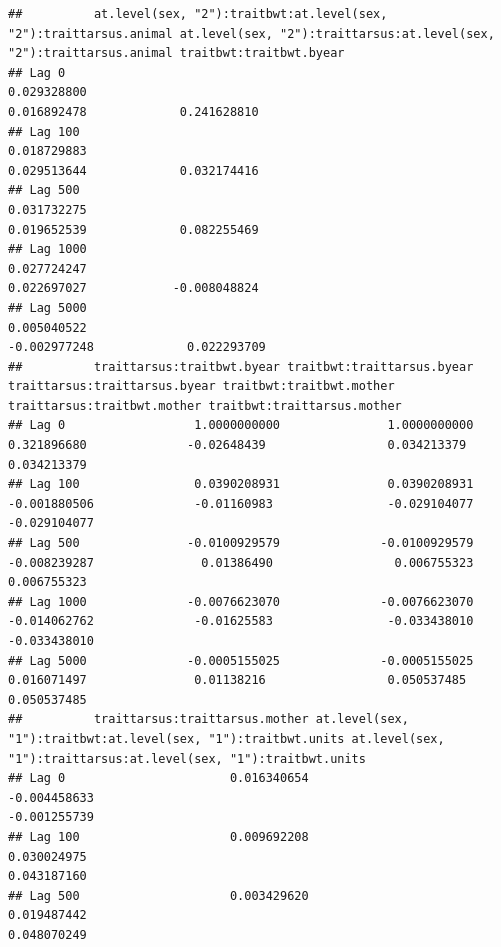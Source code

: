 \documentclass[
  12pt,
]{book}
\begin{document}
\begin{verbatim}
##          at.level(sex, "2"):traitbwt:at.level(sex, "2"):traittarsus.animal at.level(sex, "2"):traittarsus:at.level(sex, "2"):traittarsus.animal traitbwt:traitbwt.byear
## Lag 0                                                          0.029328800                                                          0.016892478             0.241628810
## Lag 100                                                        0.018729883                                                          0.029513644             0.032174416
## Lag 500                                                        0.031732275                                                          0.019652539             0.082255469
## Lag 1000                                                       0.027724247                                                          0.022697027            -0.008048824
## Lag 5000                                                       0.005040522                                                         -0.002977248             0.022293709
##          traittarsus:traitbwt.byear traitbwt:traittarsus.byear traittarsus:traittarsus.byear traitbwt:traitbwt.mother traittarsus:traitbwt.mother traitbwt:traittarsus.mother
## Lag 0                  1.0000000000               1.0000000000                   0.321896680              -0.02648439                 0.034213379                 0.034213379
## Lag 100                0.0390208931               0.0390208931                  -0.001880506              -0.01160983                -0.029104077                -0.029104077
## Lag 500               -0.0100929579              -0.0100929579                  -0.008239287               0.01386490                 0.006755323                 0.006755323
## Lag 1000              -0.0076623070              -0.0076623070                  -0.014062762              -0.01625583                -0.033438010                -0.033438010
## Lag 5000              -0.0005155025              -0.0005155025                   0.016071497               0.01138216                 0.050537485                 0.050537485
##          traittarsus:traittarsus.mother at.level(sex, "1"):traitbwt:at.level(sex, "1"):traitbwt.units at.level(sex, "1"):traittarsus:at.level(sex, "1"):traitbwt.units
## Lag 0                       0.016340654                                                  -0.004458633                                                     -0.001255739
## Lag 100                     0.009692208                                                   0.030024975                                                      0.043187160
## Lag 500                     0.003429620                                                   0.019487442                                                      0.048070249

\end{verbatim}
\end{document}
